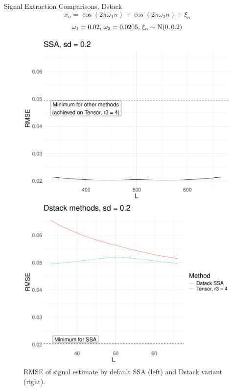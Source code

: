 \documentclass[pdf, unicode, ucs, notheorems]{beamer}
\theoremstyle{definition}
\begin{document}
\begin{frame}{Signal Extraction Comparisons, Dstack}
  \vspace*{-0.3cm}
  \[
    x_{n} = \cos(2 \pi \omega_1 n) +
    \cos(2 \pi \omega_2 n) + \xi_n
  \]
  \[\omega_1 = 0.02,\, \omega_2 = 0.0205,\, \xi_n \sim \mathrm{N}(0, 0.2)\]

  \begin{figure}[!ht]
    \begin{minipage}{0.48\textwidth}
      \centering
      \includegraphics[width=\textwidth]{htlsd_byL_real_rec_rmse_ssa_2.pdf}
    \end{minipage}
    \begin{minipage}{0.48\textwidth}
      \centering
      \includegraphics[width=\textwidth]{htlsd_byL_real_rec_rmse_dstack_2.pdf}
    \end{minipage}
    \caption{RMSE of signal estimate by default SSA
    (left) and Dstack variant (right).}
  \end{figure}
\end{frame}
\end{document}
